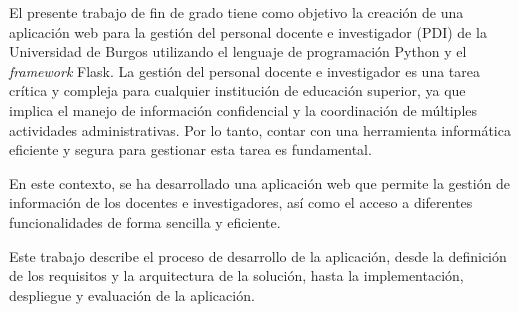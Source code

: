 
El presente trabajo de fin de grado tiene como objetivo la creación de una aplicación web para la gestión del personal docente e investigador (PDI) de la Universidad de Burgos utilizando el lenguaje de programación Python y el \textit{framework} Flask.
 La gestión del personal docente e investigador es una tarea crítica y compleja para cualquier institución de educación superior, ya que implica el manejo de información confidencial y la coordinación de múltiples actividades administrativas. 
Por lo tanto, contar con una herramienta informática eficiente y segura para gestionar esta tarea es fundamental.

En este contexto, se ha desarrollado una aplicación web que permite la gestión de información de los docentes e investigadores, así como el acceso a diferentes funcionalidades de forma sencilla y eficiente. 

Este trabajo describe el proceso de desarrollo de la aplicación, desde la definición de los requisitos y la arquitectura de la solución, hasta la implementación, despliegue y evaluación de la aplicación. 